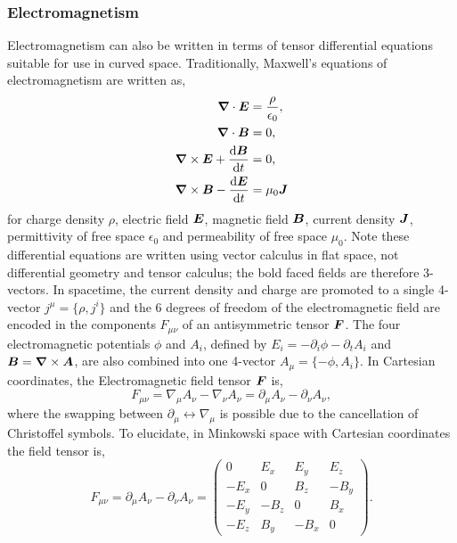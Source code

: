 \subsubsection{Electromagnetism}
Electromagnetism can also be written in terms of tensor differential equations suitable for use in curved space. Traditionally, Maxwell's equations of electromagnetism are written as,
\begin{align}
\boldsymbol{\nabla} \cdot \boldsymbol{E} &= \frac{\rho}{\epsilon_0} ,\label{intro:eq:max1}\\
\boldsymbol{\nabla} \cdot \boldsymbol{B} &= 0 ,\label{intro:eq:max2}\\
\boldsymbol{\nabla} \times \boldsymbol{E}  + \frac{\dd \boldsymbol{B}}{\dd t} &=0,\label{intro:eq:max3}\\
\boldsymbol{\nabla} \times \boldsymbol{B} -\frac{\dd \boldsymbol{E}}{\dd t} &= \mu_0 \boldsymbol{J}\label{intro:eq:max4}
\end{align}
for charge density $\rho$, electric field $\boldsymbol{E}$, magnetic field $\boldsymbol{B}$, current density $\boldsymbol{J}$, permittivity of free space $\epsilon_0$ and permeability of free space $\mu_0$. Note these differential equations are written using vector calculus in flat space, not differential geometry and tensor calculus; the bold faced fields are therefore 3-vectors. In spacetime, the current density and charge are promoted to a single 4-vector $j^\mu = \{\rho,j^i\}$ and the 6 degrees of freedom of the electromagnetic field are encoded in the components $F_{\mu\nu}$ of an antisymmetric tensor $\boldsymbol{F}$. The four electromagnetic potentials $\phi$ and $A_i$, defined by $E_i = -\partial_i \phi - \partial_t A_i$ and $\boldsymbol{B} = \boldsymbol{\nabla}\times \boldsymbol{A}$, are also combined into one 4-vector $A_\mu = \{-\phi,A_i\}$. In Cartesian coordinates, the Electromagnetic field tensor $\boldsymbol{F}$ is,
\begin{equation}
F_{\mu\nu} = \nabla_\mu A_\nu - \nabla_\nu A_\nu = \partial_\mu A_\nu - \partial_\nu A_\nu ,
\end{equation}
where the swapping between $\partial_\mu \leftrightarrow \nabla_\mu$ is possible due to the cancellation of Christoffel symbols. To elucidate, in Minkowski space with Cartesian coordinates the field tensor is,
\begin{equation}
F_{\mu\nu} = \partial_\mu A_\nu - \partial_\nu A_\nu = \begin{pmatrix} 0 & E_x & E_y & E_z \\  -E_x & 0 & B_z & -B_y \\  -E_y & -B_z & 0 & B_x \\  -E_z & B_y & -B_x & 0 \end{pmatrix}.
\end{equation}
